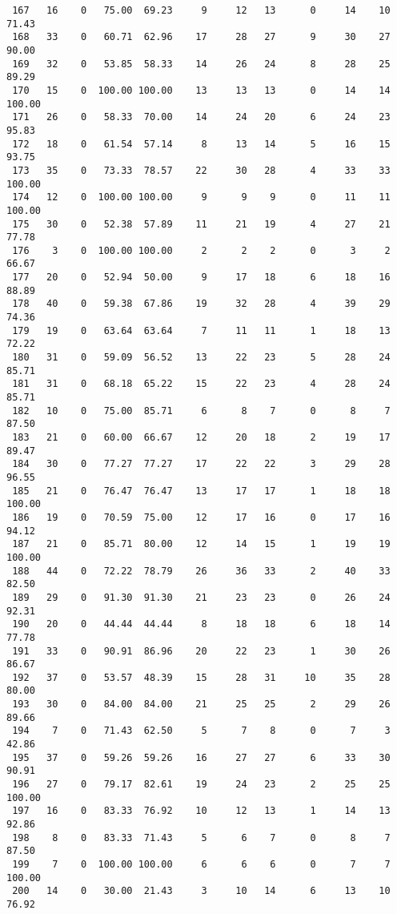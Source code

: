 \begin{verbatim}
 167   16    0   75.00  69.23     9     12   13      0     14    10    71.43
 168   33    0   60.71  62.96    17     28   27      9     30    27    90.00
 169   32    0   53.85  58.33    14     26   24      8     28    25    89.29
 170   15    0  100.00 100.00    13     13   13      0     14    14   100.00
 171   26    0   58.33  70.00    14     24   20      6     24    23    95.83
 172   18    0   61.54  57.14     8     13   14      5     16    15    93.75
 173   35    0   73.33  78.57    22     30   28      4     33    33   100.00
 174   12    0  100.00 100.00     9      9    9      0     11    11   100.00
 175   30    0   52.38  57.89    11     21   19      4     27    21    77.78
 176    3    0  100.00 100.00     2      2    2      0      3     2    66.67
 177   20    0   52.94  50.00     9     17   18      6     18    16    88.89
 178   40    0   59.38  67.86    19     32   28      4     39    29    74.36
 179   19    0   63.64  63.64     7     11   11      1     18    13    72.22
 180   31    0   59.09  56.52    13     22   23      5     28    24    85.71
 181   31    0   68.18  65.22    15     22   23      4     28    24    85.71
 182   10    0   75.00  85.71     6      8    7      0      8     7    87.50
 183   21    0   60.00  66.67    12     20   18      2     19    17    89.47
 184   30    0   77.27  77.27    17     22   22      3     29    28    96.55
 185   21    0   76.47  76.47    13     17   17      1     18    18   100.00
 186   19    0   70.59  75.00    12     17   16      0     17    16    94.12
 187   21    0   85.71  80.00    12     14   15      1     19    19   100.00
 188   44    0   72.22  78.79    26     36   33      2     40    33    82.50
 189   29    0   91.30  91.30    21     23   23      0     26    24    92.31
 190   20    0   44.44  44.44     8     18   18      6     18    14    77.78
 191   33    0   90.91  86.96    20     22   23      1     30    26    86.67
 192   37    0   53.57  48.39    15     28   31     10     35    28    80.00
 193   30    0   84.00  84.00    21     25   25      2     29    26    89.66
 194    7    0   71.43  62.50     5      7    8      0      7     3    42.86
 195   37    0   59.26  59.26    16     27   27      6     33    30    90.91
 196   27    0   79.17  82.61    19     24   23      2     25    25   100.00
 197   16    0   83.33  76.92    10     12   13      1     14    13    92.86
 198    8    0   83.33  71.43     5      6    7      0      8     7    87.50
 199    7    0  100.00 100.00     6      6    6      0      7     7   100.00
 200   14    0   30.00  21.43     3     10   14      6     13    10    76.92

\end{verbatim}
